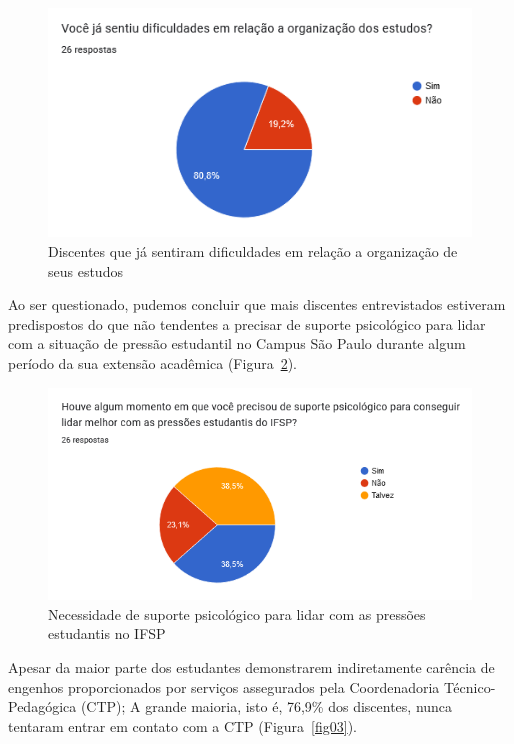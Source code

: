 \documentclass[12pt,a4paper]{article}
\begin{document}
\begin{figure}[H]
    \centering
    \includegraphics[width=14cm]{img1.png}
    \caption{Discentes que já sentiram dificuldades em relação a organização de seus estudos}
    \label{fig01}
\end{figure}

Ao ser questionado, pudemos concluir que mais discentes entrevistados estiveram predispostos do que não
tendentes a precisar de suporte psicológico para lidar com a situação de pressão estudantil no Campus São
Paulo durante algum período da sua extensão acadêmica (Figura~\ref{fig02}). 

\begin{figure}[H]
    \centering
    \includegraphics[width=15cm]{img2.png}
    \caption{Necessidade de suporte psicológico para lidar com as pressões estudantis no IFSP}
    \label{fig02}
\end{figure}

Apesar da maior parte dos estudantes demonstrarem indiretamente carência de engenhos proporcionados por serviços assegurados pela Coordenadoria Técnico-Pedagógica (CTP); A grande maioria, isto é, 76,9\% dos discentes, nunca tentaram entrar em contato com a CTP (Figura~\ref{fig03}).
\end{document}
